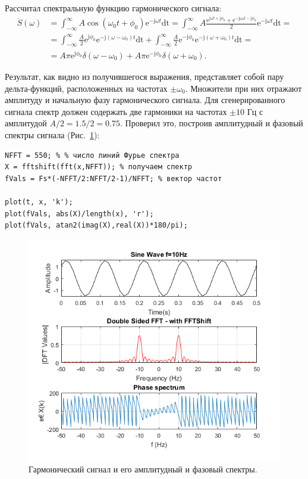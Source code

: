 \documentclass[12pt,a4paper]{article}
\begin{document}
Рассчитал спектральную функцию гармонического сигнала:
\begin{equation}
\nonumber
\begin{split}
  \dot{S}\left(\omega\right)&=\int_{-\infty}^{\infty}{A\cos\left(\omega_0 t+\phi_0\right)\mathrm{e}^{-\mathrm{j}\omega t}\mathrm{dt}}=\int_{-\infty}^{\infty}{A\frac{\mathrm{e}^{\mathrm{j}\omega t+\mathrm{j}\phi_0}+\mathrm{e}^{-\mathrm{j}\omega_0 t-\mathrm{j}\phi_0}}{2}\mathrm{e}^{-\mathrm{j}\omega t}\mathrm{dt}}=\\
  &=\int_{-\infty}^{\infty}{\frac{A}{2}\mathrm{e}^{\mathrm{j}\phi_0}\mathrm{e}^{-\mathrm{j}\left(\omega -\omega_0\right)t}\mathrm{dt}}+\int_{-\infty}^{\infty}{\frac{A}{2}\mathrm{e}^{-\mathrm{j}\phi_0}\mathrm{e}^{-\mathrm{j}\left(\omega+\omega_0\right)t}\mathrm{dt}}=\\
  &=A\pi\mathrm{e}^{\mathrm{j}\phi_0}\delta\left(\omega-\omega_0\right)+A\pi\mathrm{e}^{-\mathrm{j}\phi_0}\delta\left(\omega+\omega_0\right).
\end{split}
\end{equation}

Результат, как видно из получившегося выражения, представляет собой пару дельта-функций, расположенных на частотах $\pm\omega_0$. Множители при них отражают амплитуду и начальную фазу гармонического сигнала. Для сгенерированного сигнала спектр должен содержать две гармоники на частотах $\pm10$ Гц с амплитудой $A/2=1.5/2=0.75$. Проверил это, построив амплитудный и фазовый спектры сигнала (Рис.~\ref{img:sp_sin}):
\begin{verbatim}
NFFT = 550;	% % число линий Фурье спектра
X = fftshift(fft(x,NFFT)); % получаем спектр
fVals = Fs*(-NFFT/2:NFFT/2-1)/NFFT;	% вектор частот	 

plot(t, x, 'k');
plot(fVals, abs(X)/length(x), 'r');	 	 
plot(fVals, atan2(imag(X),real(X))*180/pi);
\end{verbatim}
\begin{figure}[H]
\includegraphics[width=\linewidth]{sp_sin}
\caption{Гармонический сигнал и его амплитудный и фазовый спектры.}
\label{img:sp_sin}
\end{figure}
\end{document}
